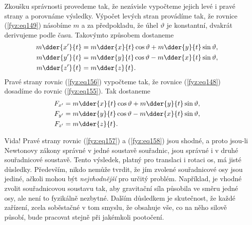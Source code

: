    Zkoušku správnosti provedeme tak, že nezávisle vypočteme jejich levé i pravé strany a porovnáme 
    výsledky. Výpočet levých stran provádíme tak, že rovnice (\ref{fyz:eq149}) násobíme \(m\) a za 
    předpokladu, že úhel \(\vartheta\) je konstantní, dvakrát derivujeme podle času. Takovýmto 
    způsobem dostaneme
    \begin{subequations}
      \label{fyz:eq157}
      \begin{align}
        m\dder{x'}{t} &= 
          m\dder{x}{t}\cos\vartheta + m\dder{y}{t}\sin\vartheta, \label{fyz:eq157a}\\
        m\dder{y'}{t} &= 
          m\dder{y}{t}\cos\vartheta - m\dder{x}{t}\sin\vartheta, \label{fyz:eq157b}\\
        m\dder{z'}{t} &= 
          m\dder{z}{t}.                                          \label{fyz:eq157c}
      \end{align}
    \end{subequations}
    Pravé strany rovnic (\ref{fyz:eq156}) vypočteme tak, že rovnice (\ref{fyz:eq148}) dosadíme do 
    rovnic (\ref{fyz:eq155}). Tak dostaneme
    \begin{subequations}
      \label{fyz:eq158}
      \begin{align}
        F_{x'} &= m\dder{x}{t}\cos\vartheta + m\dder{y}{t}\sin\vartheta, \label{fyz:eq158a}\\
        F_{y'} &= m\dder{y}{t}\cos\vartheta - m\dder{x}{t}\sin\vartheta, \label{fyz:eq158b}\\
        F_{z'} &= m\dder{z}{t}.                                          \label{fyz:eq158c}
      \end{align}
    \end{subequations}
    
    Vida! Pravé strany rovnic (\ref{fyz:eq157}) a (\ref{fyz:eq158}) jsou shodné, a proto jsou-li
    Newtonovy zákony správné v jedné soustavě souřadnic, jsou správné i v druhé souřadnicové
    soustavě. Tento výsledek, platný pro translaci i rotaci os, má jisté důsledky. Především, nikdo
    nemůže tvrdit, že jím zvolené souřadnicové osy jsou jediné, ačkoli mohou být \emph{nejvhodnější}
    pro určitý problém. Například, je vhodné zvolit souřadnicovou soustavu tak, aby gravitační síla
    působila ve směru jedné osy, ale není to fyzikálně nezbytné. Dalším důsledkem je skutečnost, že
    každé zařízení, zcela soběstačné v tom smyslu, že obsahuje vše, co na něho silově působí, bude
    pracovat stejně při jakémkoli pootočení.
    
